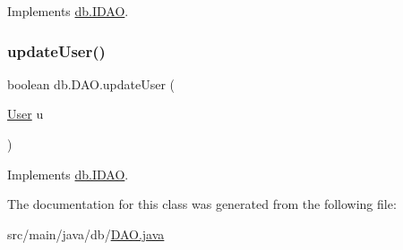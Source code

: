 Implements \hyperlink{interfacedb_1_1_i_d_a_o_a7288e76ee3ce667c0d0d7ecaeef0d94e}{db.\+I\+D\+AO}.

\mbox{\label{classdb_1_1_d_a_o_a5cd4462deb77065c2d12471cd73b3ec8}} 
\subsubsection{\texorpdfstring{update\+User()}{updateUser()}}
{\footnotesize\ttfamily boolean db.\+D\+A\+O.\+update\+User (\begin{DoxyParamCaption}\item[{\hyperlink{classserver_1_1data_1_1_user}{User}}]{u }\end{DoxyParamCaption})}



Implements \hyperlink{interfacedb_1_1_i_d_a_o_adbc5f00b7bcdffb6692367a3c9564193}{db.\+I\+D\+AO}.



The documentation for this class was generated from the following file\+:\begin{DoxyCompactItemize}
\item 
src/main/java/db/\hyperlink{_d_a_o_8java}{D\+A\+O.\+java}\end{DoxyCompactItemize}
